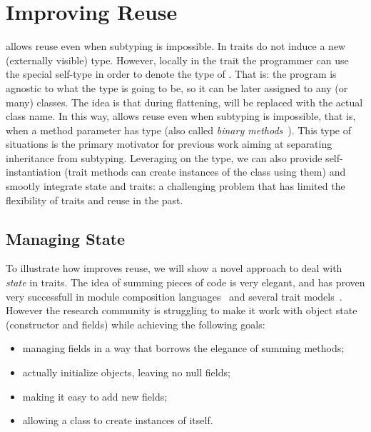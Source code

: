\section{Improving Reuse}
\name allows reuse even when subtyping is impossible.
In \name traits do not induce a new (externally visible) type.
However, locally in the trait the programmer can use the special self-type \Q@This@ in order to denote the 
type of \Q@this@.
That is: the program is agnostic to what the \Q@This@ type is going to be, so it can
be later assigned to any (or many) classes. 
The idea is that during flattening, \Q@This@ will be replaced with the actual class name.
In this way, \name allows reuse even when subtyping is
impossible, that is, when a method parameter has type \Q@This@ (also called \emph{binary
  methods}~\cite{bruce96binary}). 
This type of situations is the primary motivator
for previous work aiming at separating inheritance from subtyping.
Leveraging on the \Q@This@ type, we can also provide self-instantiation (trait methods can create instances of the class using them) and smootly integrate state and traits: a challenging problem that has limited the flexibility of traits and
reuse in the past.

\subsection{Managing State}

To illustrate how \name improves reuse, we will show a novel approach
to deal with \emph{state} in traits.  The idea of summing pieces of
code is very elegant, and has proven very successfull in module
composition languages~\cite{ancona2002calculus} and several trait
models~\cite{Traits:ECOOP2003}.  However the research
community is struggling to make it work with object state (constructor
and fields) while achieving the following goals:

\begin{itemize}
\item managing fields in a way that borrows the elegance of summing methods;
\item actually initialize objects, leaving no null fields;
\item making it easy to add new fields;
\item allowing a class to create instances of itself.
\end{itemize}

